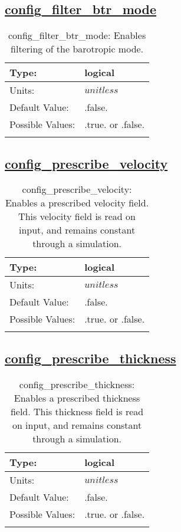\subsection[config\_filter\_btr\_mode]{\hyperref[sec:nm_tab_debug]{config\_filter\_btr\_mode}}
\label{subsec:nm_sec_config_filter_btr_mode}
\begin{center}
\begin{longtable}{| p{2.0in} | p{4.0in} |}
    \hline
    Type: & logical \\
    \hline
    Units: & $unitless$ \\
    \hline
    Default Value: & .false. \\
    \hline
    Possible Values: & .true. or .false. \\
    \hline
    \caption{config\_filter\_btr\_mode: Enables filtering of the barotropic mode.}
\end{longtable}
\end{center}
\subsection[config\_prescribe\_velocity]{\hyperref[sec:nm_tab_debug]{config\_prescribe\_velocity}}
\label{subsec:nm_sec_config_prescribe_velocity}
\begin{center}
\begin{longtable}{| p{2.0in} | p{4.0in} |}
    \hline
    Type: & logical \\
    \hline
    Units: & $unitless$ \\
    \hline
    Default Value: & .false. \\
    \hline
    Possible Values: & .true. or .false. \\
    \hline
    \caption{config\_prescribe\_velocity: Enables a prescribed velocity field. This velocity field is read on input, and remains constant through a simulation.}
\end{longtable}
\end{center}
\subsection[config\_prescribe\_thickness]{\hyperref[sec:nm_tab_debug]{config\_prescribe\_thickness}}
\label{subsec:nm_sec_config_prescribe_thickness}
\begin{center}
\begin{longtable}{| p{2.0in} | p{4.0in} |}
    \hline
    Type: & logical \\
    \hline
    Units: & $unitless$ \\
    \hline
    Default Value: & .false. \\
    \hline
    Possible Values: & .true. or .false. \\
    \hline
    \caption{config\_prescribe\_thickness: Enables a prescribed thickness field. This thickness field is read on input, and remains constant through a simulation.}
\end{longtable}
\end{center}
